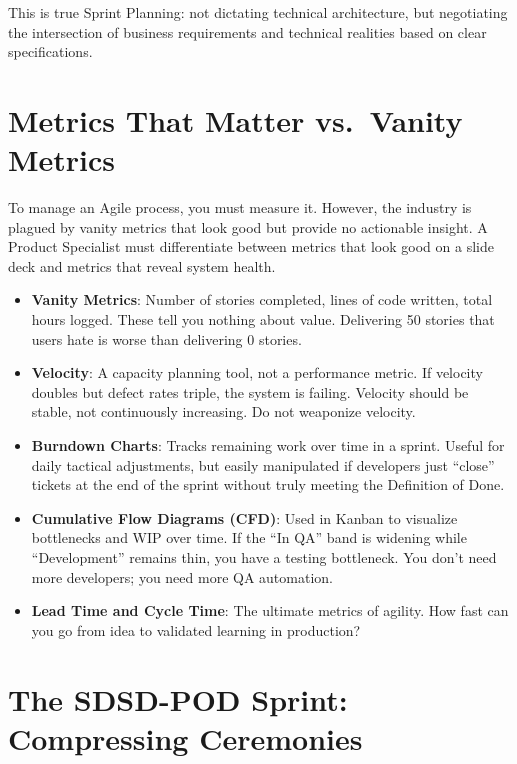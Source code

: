 This is true Sprint Planning: not dictating technical architecture, but
negotiating the intersection of business requirements and technical
realities based on clear specifications.

\section{Metrics That Matter vs.~Vanity
Metrics}\label{metrics-that-matter-vs.-vanity-metrics}

To manage an Agile process, you must measure it. However, the industry
is plagued by vanity metrics that look good but provide no actionable
insight. A Product Specialist must differentiate between metrics that
look good on a slide deck and metrics that reveal system health.

\begin{itemize}
\tightlist
\item
  \textbf{Vanity Metrics}: Number of stories completed, lines of code
  written, total hours logged. These tell you nothing about value.
  Delivering 50 stories that users hate is worse than delivering 0
  stories.
\item
  \textbf{Velocity}: A capacity planning tool, not a performance metric.
  If velocity doubles but defect rates triple, the system is failing.
  Velocity should be stable, not continuously increasing. Do not
  weaponize velocity.
\item
  \textbf{Burndown Charts}: Tracks remaining work over time in a sprint.
  Useful for daily tactical adjustments, but easily manipulated if
  developers just ``close'' tickets at the end of the sprint without
  truly meeting the Definition of Done.
\item
  \textbf{Cumulative Flow Diagrams (CFD)}: Used in Kanban to visualize
  bottlenecks and WIP over time. If the ``In QA'' band is widening while
  ``Development'' remains thin, you have a testing bottleneck. You don't
  need more developers; you need more QA automation.
\item
  \textbf{Lead Time and Cycle Time}: The ultimate metrics of agility.
  How fast can you go from idea to validated learning in production?
\end{itemize}

\section{The SDSD-POD Sprint: Compressing
Ceremonies}\label{the-sdsd-pod-sprint-compressing-ceremonies}

